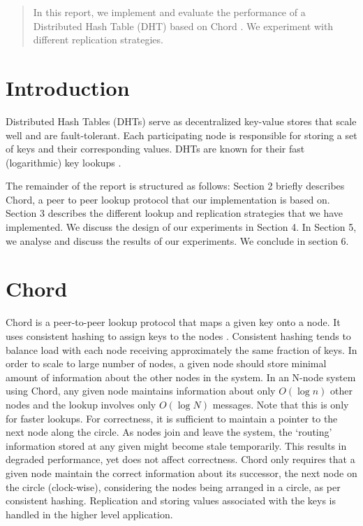 \documentclass{sig-alternate-10pt}
\begin{document}
\maketitle
\begin{abstract}
In this report, we implement and evaluate the performance of a Distributed Hash Table (DHT) based on Chord \cite{chord}. We experiment with different replication strategies.
\end{abstract}




\section{Introduction}
Distributed Hash Tables (DHTs) serve as decentralized key-value stores that scale well and are fault-tolerant. Each participating node is responsible for storing a set of keys and their corresponding values. DHTs are known for their fast (logarithmic) key lookups \cite{chord}. 

The remainder of the report is structured as follows: Section 2 briefly describes Chord, a peer to peer lookup protocol that our implementation is based on. Section 3 describes the different lookup and replication strategies that we have implemented. We discuss the design of our experiments in Section 4. In Section 5, we analyse and discuss the results of our experiments. We conclude in section 6.

\section{Chord} 
Chord is a peer-to-peer lookup protocol that maps a given key onto a node. It uses consistent hashing \cite{consistent-hashing} to assign keys to the nodes \cite{chord}. Consistent hashing tends to balance load with each node receiving approximately the same fraction of keys. In order to scale to large number of nodes, a given node should store minimal amount of information about the other nodes in the system. In an N-node system using Chord, any given node maintains information about only $O(\log n)$ other nodes and the lookup involves only $O(\log N)$ messages. Note that this is only for faster lookups. For correctness, it is sufficient to maintain a pointer to the next node along the circle.
As nodes join and leave the system, the `routing' information stored at any given might become stale temporarily. This results in degraded performance, yet does not affect correctness. Chord only requires that a given node maintain the correct information about its successor, the next node on the circle (clock-wise), considering the nodes being arranged in a circle, as per consistent hashing. Replication and storing values associated with the keys is handled in the higher level application.
\end{document}
